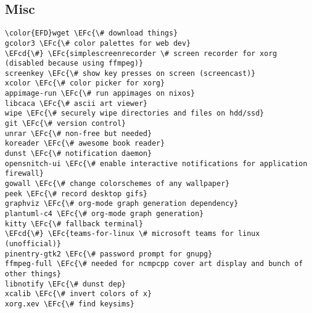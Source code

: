 \documentclass[14pt]{article}
\newcommand{\EFc}[1]{\textcolor{EFc}{#1}} %
\newcommand{\EFcd}[1]{\textcolor{EFcd}{#1}} %
\begin{document}
\subsection{Misc}
\label{sec:orgb41d5a0}
\begin{Code}
\begin{Verbatim}
\color{EFD}wget \EFc{\# download things}
gcolor3 \EFc{\# color palettes for web dev}
\EFcd{\#} \EFc{simplescreenrecorder \# screen recorder for xorg (disabled because using ffmpeg)}
screenkey \EFc{\# show key presses on screen (screencast)}
xcolor \EFc{\# color picker for xorg}
appimage-run \EFc{\# run appimages on nixos}
libcaca \EFc{\# ascii art viewer}
wipe \EFc{\# securely wipe directories and files on hdd/ssd}
git \EFc{\# version control}
unrar \EFc{\# non-free but needed}
koreader \EFc{\# awesome book reader}
dunst \EFc{\# notification daemon}
opensnitch-ui \EFc{\# enable interactive notifications for application firewall}
gowall \EFc{\# change colorschemes of any wallpaper}
peek \EFc{\# record desktop gifs}
graphviz \EFc{\# org-mode graph generation dependency}
plantuml-c4 \EFc{\# org-mode graph generation}
kitty \EFc{\# fallback terminal}
\EFcd{\#} \EFc{teams-for-linux \# microsoft teams for linux (unofficial)}
pinentry-gtk2 \EFc{\# password prompt for gnupg}
ffmpeg-full \EFc{\# needed for ncmpcpp cover art display and bunch of other things}
libnotify \EFc{\# dunst dep}
xcalib \EFc{\# invert colors of x}
xorg.xev \EFc{\# find keysims}


\end{Verbatim}
\end{Code}
\end{document}
